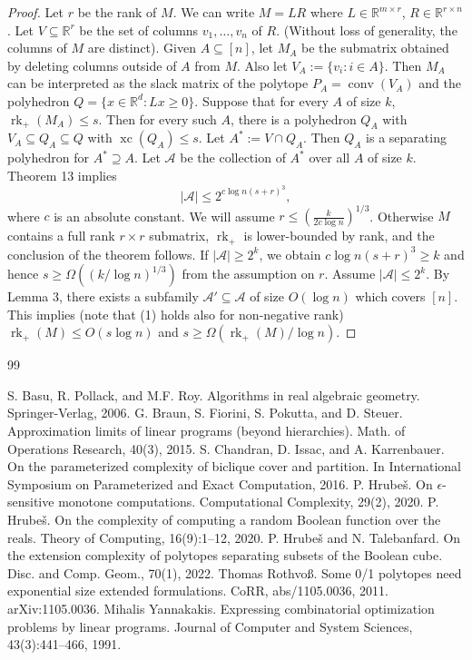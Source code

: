 \documentclass[10pt,a4paper]{article}
\newcommand{\rk}{\operatorname{rk}}
\newcommand{\xc}{\operatorname{xc}}
\newcommand{\conv}{\operatorname{conv}}
\newcommand{\RR}{\mathbb R}
\begin{document}
\begin{proof}
Let $r$ be the rank of $M$. We can write $M=LR$ where $L\in\RR^{m\times r}$, $R\in\RR^{r\times n}$. Let $V\subseteq\RR^r$ be the set of columns $v_1,\ldots,v_n$ of $R$. (Without loss of generality, the columns of $M$ are distinct). Given $A\subseteq[n]$, let $M_A$ be the submatrix obtained by deleting columns outside of $A$ from $M$. Also let $V_A:=\{v_i:i\in A\}$. Then $M_A$ can be interpreted as the slack matrix of the polytope $P_A=\conv(V_A)$ and the polyhedron $Q=\{x\in\RR^d:Lx\ge0\}$.
Suppose that for every $A$ of size $k$, $\rk_+(M_A)\le s$. Then for every such $A$, there is a polyhedron $Q_A$ with $V_A\subseteq Q_A\subseteq Q$ with $\xc(Q_A)\le s$. Let $A^*:=V\cap Q_A$. Then $Q_A$ is a separating polyhedron for $A^*\supseteq A$. Let $\mathcal A$ be the collection of $A^*$ over all $A$ of size $k$. Theorem 13 implies
\[|\mathcal A|\le2^{c\log n(s+r)^3},\]
where $c$ is an absolute constant.
We will assume $r\le(\frac k{2c\log n})^{1/3}$. Otherwise $M$ contains a full rank $r\times r$ submatrix, $\rk_+$ is lower-bounded by rank, and the conclusion of the theorem follows.
If $|\mathcal A|\ge2^k$, we obtain $c\log n(s+r)^3\ge k$ and hence $s\ge\Omega((k/\log n)^{1/3})$ from the assumption on $r$.
Assume $|\mathcal A|\le2^k$. By Lemma 3, there exists a subfamily $\mathcal A'\subseteq\mathcal A$ of size $O(\log n)$ which covers $[n]$. This implies (note that (1) holds also for non-negative rank) $\rk_+(M)\le O(s\log n)$ and $s\ge\Omega(\rk_+(M)/\log n)$.
\end{proof}

\begin{thebibliography}{99}

 S. Basu, R. Pollack, and M.F. Roy. Algorithms in real algebraic geometry. Springer-Verlag, 2006.
 G. Braun, S. Fiorini, S. Pokutta, and D. Steuer. Approximation limits of linear programs (beyond hierarchies). Math. of Operations Research, 40(3), 2015.
 S. Chandran, D. Issac, and A. Karrenbauer. On the parameterized complexity of biclique cover and partition. In International Symposium on Parameterized and Exact Computation, 2016.
 P. Hrube\v{s}. On $\epsilon$-sensitive monotone computations. Computational Complexity, 29(2), 2020.
 P. Hrube\v{s}. On the complexity of computing a random Boolean function over the reals. Theory of Computing, 16(9):1--12, 2020.
 P. Hrube\v{s} and N. Talebanfard. On the extension complexity of polytopes separating subsets of the Boolean cube. Disc. and Comp. Geom., 70(1), 2022.
 Thomas Rothvo\ss. Some 0/1 polytopes need exponential size extended formulations. CoRR, abs/1105.0036, 2011. arXiv:1105.0036.
 Mihalis Yannakakis. Expressing combinatorial optimization problems by linear programs. Journal of Computer and System Sciences, 43(3):441--466, 1991.

\end{thebibliography}
\end{document}
